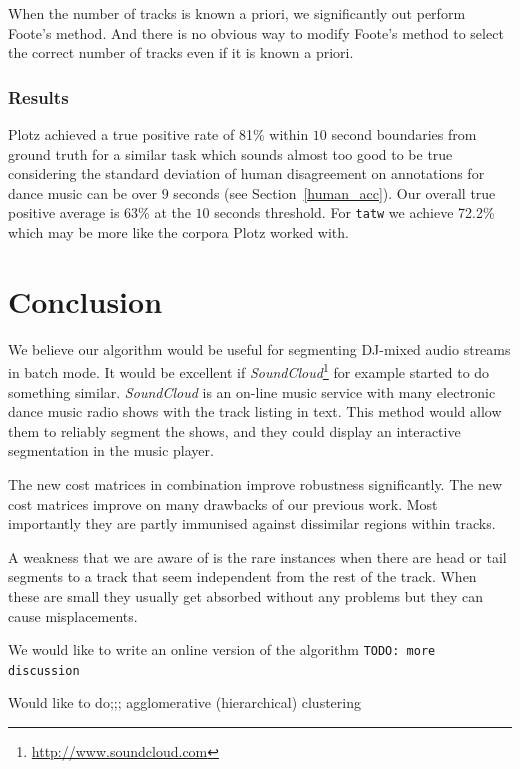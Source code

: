 \documentclass[twocolumn]{article}
\begin{document}
When the number of tracks is known a priori, we significantly out perform Foote's method. And there is no obvious way to modify Foote's method to select the correct number of tracks even if it is known a priori. 

\subsubsection{Results}


Plotz \citep{plotz2006automatic} achieved a true positive rate of 81\% within $10$ second boundaries from ground truth for a similar task which sounds almost too good to be true considering the standard deviation of human disagreement on annotations for dance music can be over $9$ seconds (see Section~\ref{human_acc}). Our overall true positive average is 63\% at the $10$ seconds threshold. For \texttt{tatw} we achieve 72.2\% which may be more like the corpora Plotz worked with.


\section{Conclusion}\label{conclusions}

We believe our algorithm would be useful for segmenting DJ-mixed audio streams in batch mode. It would be excellent if \textit{SoundCloud}\footnote{\url{http://www.soundcloud.com}} for example started to do something similar. \textit{SoundCloud} is an on-line music service with many electronic dance music radio shows with the track listing in text. This method would allow them to reliably segment the shows, and they could display an interactive segmentation in the music player. 

The new cost matrices in combination improve robustness significantly. The new cost matrices improve on many drawbacks of our previous work. Most importantly they are partly immunised against dissimilar regions within tracks. 

A weakness that we are aware of is the rare instances when there are head or tail segments to a track that seem independent from the rest of the track. When these are small they usually get absorbed without any problems but they can cause misplacements. 

We would like to write an online version of the algorithm \texttt{TODO: more discussion}

Would like to do;;;	agglomerative (hierarchical) clustering
\end{document}
